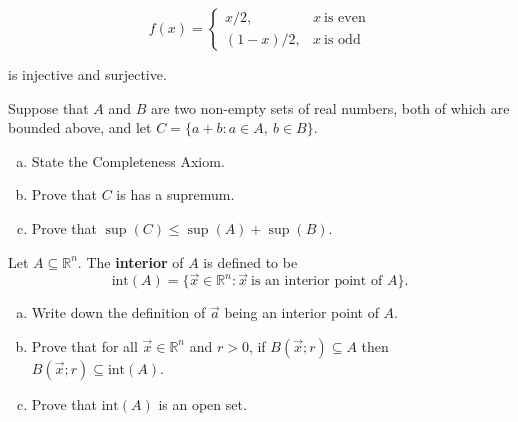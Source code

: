 \documentclass[11pt]{exam}
\theoremstyle{definition}
\begin{document}
\begin{questions}
\begin{enumerate}[(a)]
$$f(x) = \left\lbrace\begin{array}{cc}
x/2, & x\ \text{is even}\\
(1-x)/2, & x\ \text{is odd}
\end{array}\right.$$

is injective and surjective.
\end{enumerate}

\newpage
\question[10]\mbox{}

Suppose that $A$ and $B$ are two non-empty sets of real numbers, both of which are bounded above, and let $C=\{a+b: a\in A,\ b\in B\}$.

\begin{enumerate}[(a)]
\item State the Completeness Axiom.
\vspace{1in}
\item Prove that $C$ is has a supremum.
\vspace{3in}
\item Prove that $\sup(C)\leq \sup(A) + \sup(B)$.
\end{enumerate}

\newpage
\question[10]\mbox{}
Let $A\subseteq\mathbb R^n$.  The \textbf{interior} of $A$ is defined to be
$$\text{int}(A) = \{\vec x\in \mathbb R^n: \vec x\ \text{is an interior point of $A$}\}.$$
\begin{enumerate}[(a)]
\item Write down the definition of $\vec a$ being an interior point of $A$.
\vspace{1in}
\item Prove that for all $\vec x\in\mathbb R^n$ and $r>0$, if $B(\vec x; r)\subseteq A$ then $B(\vec x; r)\subseteq\text{int}(A)$.
\vspace{4in}
\item Prove that $\text{int}(A)$ is an open set.
\end{enumerate}

\end{questions}
\end{document}
